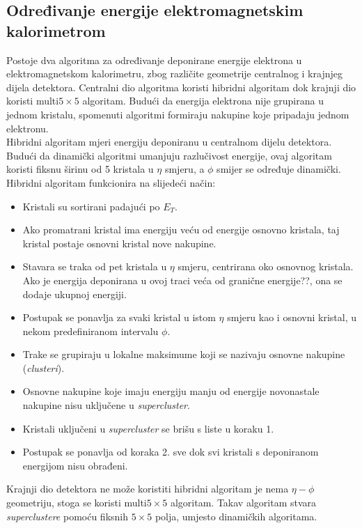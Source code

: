 \documentclass[a4paper,12pt]{report}
\begin{document}
\subsection{Određivanje energije elektromagnetskim kalorimetrom}
Postoje dva algoritma za određivanje deponirane energije elektrona u elektromagnetskom kalorimetru, zbog različite geometrije centralnog i krajnjeg dijela detektora. Centralni dio algoritma koristi hibridni algoritam dok krajnji dio koristi multi$5\times 5$ algoritam. 
Budući da energija elektrona nije grupirana u jednom kristalu, spomenuti algoritmi formiraju nakupine koje pripadaju jednom elektronu. \\
Hibridni algoritam mjeri energiju deponiranu u centralnom dijelu detektora. Budući da dinamički algoritmi umanjuju razlučivost energije, ovaj algoritam koristi fiksnu širinu od 5 kristala u $\eta$ smjeru, a $\phi$ smijer se određuje dinamički. Hibridni algoritam funkcionira na slijedeći način:
\begin{itemize}
 \item Kristali su sortirani padajući po $E_T$.
 \item Ako promatrani kristal ima energiju veću od energije osnovno kristala, taj kristal postaje osnovni kristal nove nakupine.
 \item Stavara se traka od pet kristala u $\eta$ smjeru, centrirana oko osnovnog kristala. Ako je energija deponirana u ovoj traci veća od granične energije??, ona se dodaje ukupnoj energiji.
 \item Postupak se ponavlja za svaki kristal u istom $\eta$ smjeru kao i osnovni kristal, u nekom predefiniranom intervalu $\phi$.
  \item Trake se grupiraju u lokalne maksimume koji se nazivaju osnovne nakupine (\textit{clusteri}).
  \item Osnovne nakupine koje imaju energiju manju od energije novonastale nakupine nisu uključene u \textit{supercluster}.
  \item Kristali uključeni u \textit{supercluster} se brišu s liste u koraku 1.
  \item Postupak se ponavlja od koraka 2. sve dok svi kristali s deponiranom energijom nisu obrađeni.
\end{itemize}
Krajnji dio detektora ne može koristiti hibridni algoritam je nema $\eta-\phi$ geometriju, stoga se koristi multi$5\times5$ algoritam. Takav algoritam stvara \textit{superclustere} pomoću fiksnih $5\times5$ polja, umjesto dinamičkih algoritama. 
\end{document}
